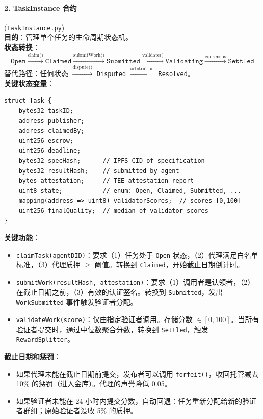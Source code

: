 \documentclass[11pt]{article}
\begin{document}
\paragraph{2. TaskInstance 合约} (\texttt{TaskInstance.py})\\
\textbf{目的}：管理单个任务的生命周期状态机。\\
\textbf{状态转换}：
\begin{equation}
\texttt{Open} \xrightarrow{\text{claim()}} \texttt{Claimed} \xrightarrow{\text{submitWork()}} \texttt{Submitted} \xrightarrow{\text{validate()}} \texttt{Validating} \xrightarrow{\text{consensus}} \texttt{Settled}
\end{equation}
替代路径：任何状态 $\xrightarrow{\text{dispute()}}$ \texttt{Disputed} $\xrightarrow{\text{arbitration}}$ \texttt{Resolved}。\\
\textbf{关键状态变量}：
\begin{verbatim}
struct Task {
    bytes32 taskID;
    address publisher;
    address claimedBy;
    uint256 escrow;
    uint256 deadline;
    bytes32 specHash;      // IPFS CID of specification
    bytes32 resultHash;    // submitted by agent
    bytes attestation;     // TEE attestation report
    uint8 state;           // enum: Open, Claimed, Submitted, ...
    mapping(address => uint8) validatorScores;  // scores [0,100]
    uint256 finalQuality;  // median of validator scores
}
\end{verbatim}
\textbf{关键功能}：
\begin{itemize}[noitemsep]
  \item \texttt{claimTask(agentDID)}：要求（1）任务处于 \texttt{Open} 状态，（2）代理满足白名单标准，（3）代理质押 $\geq$ 阈值。转换到 \texttt{Claimed}，开始截止日期倒计时。
  \item \texttt{submitWork(resultHash, attestation)}：要求（1）调用者是认领者，（2）在截止日期之前，（3）有效的认证签名。转换到 \texttt{Submitted}，发出 \texttt{WorkSubmitted} 事件触发验证者分配。
  \item \texttt{validateWork(score)}：仅由指定验证者调用。存储分数 $\in [0,100]$。当所有验证者提交时，通过中位数聚合分数，转换到 \texttt{Settled}，触发 \texttt{RewardSplitter}。
\end{itemize}
\textbf{截止日期和惩罚}：
\begin{itemize}[noitemsep]
  \item 如果代理未能在截止日期前提交，发布者可以调用 \texttt{forfeit()}，收回托管减去 10\% 的惩罚（进入金库）。代理的声誉降低 0.05。
  \item 如果验证者未能在 24 小时内提交分数，自动回退：任务重新分配给新的验证者群组；原始验证者没收 5\% 的质押。
\end{itemize}
\end{document}
